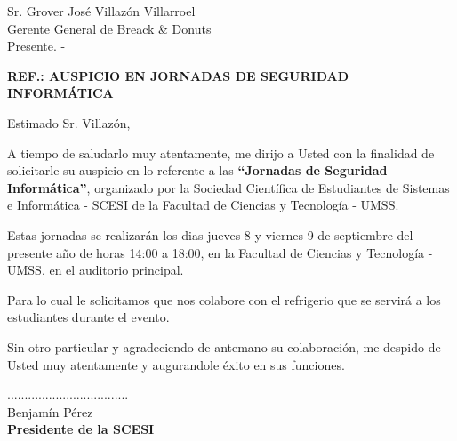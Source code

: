 \documentclass[letterpaper,12pt]{letter}
\begin{document}
\date {12 de agosto de 2011}

\begin{letter}{Sr. Grover Jos\'e Villaz\'on Villarroel \\ Gerente General de Breack \& Donuts \\\underline {Presente}. -}

\begin{center}
	\opening{\textbf{REF.: AUSPICIO EN JORNADAS DE SEGURIDAD INFORM\'ATICA}}
\end{center}

Estimado Sr. Villaz\'on,

A tiempo de saludarlo muy atentamente, me dirijo a Usted con la finalidad de solicitarle su auspicio en lo referente 
a las {\bfseries ``Jornadas de Seguridad Inform\'atica''}, organizado por la Sociedad Cient\'ifica de Estudiantes de 
Sistemas e Inform\'atica - SCESI de la Facultad de Ciencias y Tecnolog\'ia - UMSS.

Estas jornadas se realizar\'an los dias jueves 8 y viernes 9 de septiembre del presente a\~no de horas 14:00 a 
18:00, en la Facultad de Ciencias y Tecnolog\'ia - UMSS, en el auditorio principal.

Para lo cual le solicitamos que nos colabore con el refrigerio que se servir\'a a los estudiantes durante el evento.

Sin otro particular y agradeciendo de antemano su colaboraci\'on, me despido de Usted muy atentamente y augurandole \'exito en sus funciones.\\

\vspace{2cm}

\begin{center}
...................................\\
Benjam\'in P\'erez\\
{\bfseries Presidente de la  SCESI}
\end{center}

\end{letter}
\end{document}

